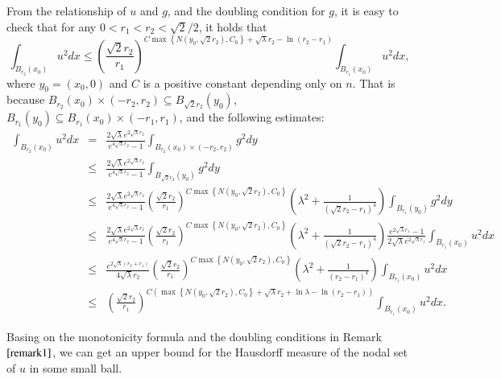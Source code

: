 \documentclass[a4paper, 12pt, onecolumn]{article} \textwidth 148mm
\begin{document}
\begin{remark}\label{remark1}
From the relationship of $u$ and $g$, and the doubling condition for $g$,
it is easy to check that for any $0<r_1<r_2<\sqrt{2}/2$, it holds that
\begin{equation}\label{doubling condition from g to u}
\int_{B_{r_2}(x_0)}u^2dx\leq\left(\frac{\sqrt{2}r_2}{r_1}\right)
^{C\max\left\{N(y_0,\sqrt{2}r_2),C_0\right\}+\sqrt{\lambda}r_2-\ln(r_2-r_1)}
\int_{B_{r_1}(x_0)}u^2dx,
\end{equation}
where $y_0=(x_0,0)$ and $C$ is a positive constant depending only on $n$. That is because $B_{r_2}(x_0)\times(-r_2,r_2)\subseteq B_{\sqrt{2}r_2}(y_0)$,
$B_{r_1}(y_0)\subseteq B_{r_1}(x_0)\times(-r_1,r_1)$, and the following estimates:
\begin{eqnarray*}
\int_{B_{r_2}(x_0)}u^2dx&=&\frac{2\sqrt{\lambda}
e^{2\sqrt{\lambda}r_2}}{e^{4\sqrt{\lambda}r_2}-1}\int_{B_{r_2}(x_0)\times(-r_2,r_2)}g^2dy
\\&\leq&\frac{2\sqrt{\lambda}e^{2\sqrt{\lambda}r_2}}{e^{4\sqrt{\lambda}r_2}-1}\int_{B_{\sqrt{2}r_2}(y_0)}g^2dy
\\&\leq&\frac{2\sqrt{\lambda}e^{2\sqrt{\lambda}r_2}}{e^{4\sqrt{\lambda}r_2}-1}
\left(\frac{\sqrt{2}r_2}{r_1}\right)^{C\max\left\{N(y_0,\sqrt{2}r_2),C_0\right\}}
\left(\lambda^2+\frac{1}{(\sqrt{2}r_2-r_1)^4}\right)\int_{B_{r_1}(y_0)}g^2dy
\\&\leq&\frac{2\sqrt{\lambda}e^{2\sqrt{\lambda}r_2}}{e^{4\sqrt{\lambda}r_2}-1}
\left(\frac{\sqrt{2}r_2}{r_1}\right)^{C\max\left\{N(y_0,\sqrt{2}r_2),C_0\right\}}
\left(\lambda^2+\frac{1}{(\sqrt{2}r_2-r_1)^4}\right)
\frac{e^{2\sqrt{\lambda}r_1}-1}{2\sqrt{\lambda}e^{2\sqrt{\lambda}r_1}}
\int_{B_{r_1}(x_0)}u^2dx
\\&\leq&\frac{e^{2\sqrt{\lambda}(r_2+r_1)}}{4\sqrt{\lambda}r_2}
\left(\frac{\sqrt{2}r_2}{r_1}\right)^{C\max\left\{N(y_0,\sqrt{2}r_2),C_0\right\}}
\left(\lambda^2+\frac{1}{(r_2-r_1)^4}\right)\int_{B_{r_1}(x_0)}u^2dx
\\
&\leq&\left(\frac{\sqrt{2}r_2}{r_1}\right)
^{C\left(\max\left\{N(y_0,\sqrt{2}r_2),C_0\right\}+\sqrt{\lambda}r_2+\ln\lambda-\ln(r_2-r_1)\right)}
\int_{B_{r_1}(x_0)}u^2dx.
\end{eqnarray*}
\end{remark}

Basing on the monotonicity formula and the doubling conditions in Remark $\ref{remark1}$, we can get an upper bound for the Hausdorff measure of the nodal set of $u$ in some small ball.
\end{document}
